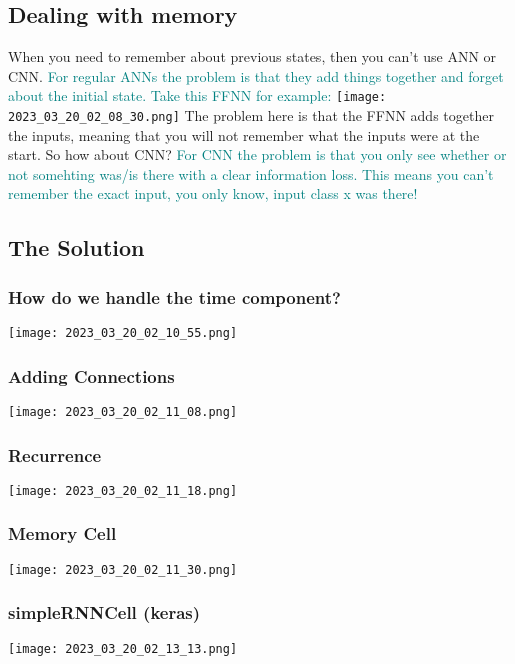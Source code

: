 \documentclass[main.tex,fontsize=8pt,paper=a4,paper=portrait,DIV=calc,]{scrartcl}
\begin{document}
\subsection{Dealing with memory}
When you need to remember about previous states, then you can't use ANN or CNN.\newline
\textcolor{teal}{For regular ANNs the problem is that they add things together and forget about the initial state.\newline
Take this FFNN for example:}\newline
\texttt{[image: 2023\_03\_20\_02\_08\_30.png]}\newline
The problem here is that the FFNN adds together the inputs, meaning that you will not remember what the inputs were at the start.\newline
So how about CNN?\newline
\textcolor{teal}{For CNN the problem is that you only see whether or not somehting was/is there with a clear information loss.\newline
This means you can't remember the exact input, you only know, input class x was there!} 

\subsection{The Solution}
\subsubsection{How do we handle the time component?}
\texttt{[image: 2023\_03\_20\_02\_10\_55.png]}
\subsubsection{Adding Connections}
\texttt{[image: 2023\_03\_20\_02\_11\_08.png]}
\subsubsection{Recurrence}
\texttt{[image: 2023\_03\_20\_02\_11\_18.png]}
\subsubsection{Memory Cell}
\texttt{[image: 2023\_03\_20\_02\_11\_30.png]}
\subsubsection{simpleRNNCell (keras)}
\texttt{[image: 2023\_03\_20\_02\_13\_13.png]}
\end{document}
